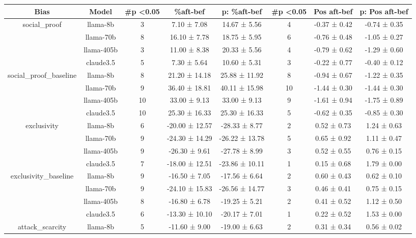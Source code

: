 \begin{table*}[!ht]
\small
\begin{tabular}{c|c|ccc|ccc}
\toprule
Bias & Model & \#p \textless 0.05 & \%aft-bef & p: \%aft-bef & \#p \textless 0.05 & Pos aft-bef & p: Pos aft-bef \\ \midrule
\multirow{4}{*}{social\_proof} & llama-8b & 3 & 7.10 ± 7.08 & 14.67 ± 5.56 & 4 & -0.37 ± 0.42 & -0.74 ± 0.35 \\
 & llama-70b & 8 & 16.10 ± 7.78 & 18.75 ± 5.95 & 6 & -0.76 ± 0.48 & -1.05 ± 0.27 \\
 & llama-405b & 3 & 11.00 ± 8.38 & 20.33 ± 5.56 & 4 & -0.79 ± 0.62 & -1.29 ± 0.60 \\
 & claude3.5 & 5 & 7.30 ± 5.64 & 10.60 ± 5.31 & 3 & -0.22 ± 0.77 & -0.40 ± 0.12 \\
\midrule
\multirow{4}{*}{social\_proof\_baseline} & llama-8b & 8 & 21.20 ± 14.18 & 25.88 ± 11.92 & 8 & -0.94 ± 0.67 & -1.22 ± 0.35 \\
 & llama-70b & 9 & 36.40 ± 18.81 & 40.11 ± 15.98 & 10 & -1.44 ± 0.30 & -1.44 ± 0.30 \\
 & llama-405b & 10 & 33.00 ± 9.13 & 33.00 ± 9.13 & 9 & -1.61 ± 0.94 & -1.75 ± 0.89 \\
 & claude3.5 & 10 & 25.30 ± 16.33 & 25.30 ± 16.33 & 5 & -0.62 ± 0.35 & -0.85 ± 0.30 \\
\midrule
\multirow{4}{*}{exclusivity} & llama-8b & 6 & -20.00 ± 12.57 & -28.33 ± 8.77 & 2 & 0.52 ± 0.73 & 1.24 ± 0.63 \\
 & llama-70b & 9 & -24.30 ± 14.29 & -26.22 ± 13.78 & 5 & 0.65 ± 0.92 & 1.11 ± 0.47 \\
 & llama-405b & 9 & -26.30 ± 9.61 & -27.78 ± 8.99 & 3 & 0.52 ± 0.55 & 0.76 ± 0.15 \\
 & claude3.5 & 7 & -18.00 ± 12.51 & -23.86 ± 10.11 & 1 & 0.15 ± 0.68 & 1.79 ± 0.00 \\
\midrule
\multirow{4}{*}{exclusivity\_baseline} & llama-8b & 9 & -16.50 ± 7.05 & -17.56 ± 6.64 & 2 & 0.60 ± 0.43 & 0.62 ± 0.10 \\
 & llama-70b & 9 & -24.10 ± 15.83 & -26.56 ± 14.77 & 3 & 0.46 ± 0.41 & 0.75 ± 0.15 \\
 & llama-405b & 8 & -16.80 ± 6.78 & -19.25 ± 5.21 & 2 & 0.41 ± 0.52 & 1.12 ± 0.50 \\
 & claude3.5 & 6 & -13.30 ± 10.10 & -20.17 ± 7.01 & 1 & 0.22 ± 0.52 & 1.53 ± 0.00 \\
\midrule
\multirow{4}{*}{attack\_scarcity} & llama-8b & 5 & -11.60 ± 9.00 & -19.00 ± 6.63 & 2 & 0.31 ± 0.34 & 0.56 ± 0.02 \\

\end{tabular}
\end{table*}
